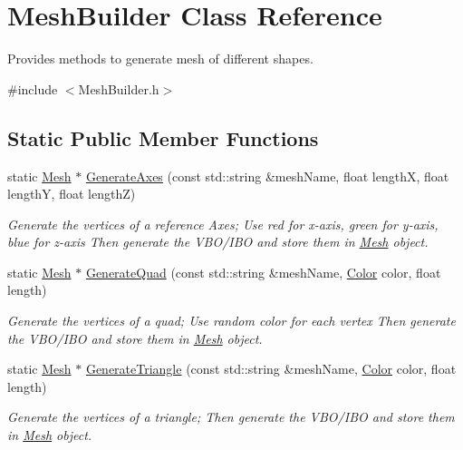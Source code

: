 \hypertarget{class_mesh_builder}{\section{Mesh\+Builder Class Reference}
\label{class_mesh_builder}
}


Provides methods to generate mesh of different shapes.  




{\ttfamily \#include $<$Mesh\+Builder.\+h$>$}

\subsection*{Static Public Member Functions}
\begin{DoxyCompactItemize}
\item 
static \hyperlink{class_mesh}{Mesh} $\ast$ \hyperlink{class_mesh_builder_a78d37e2b0cc068eec801f17c367100e7}{Generate\+Axes} (const std\+::string \&mesh\+Name, float length\+X, float length\+Y, float length\+Z)
\begin{DoxyCompactList}\small\item\em Generate the vertices of a reference Axes; Use red for x-\/axis, green for y-\/axis, blue for z-\/axis Then generate the V\+B\+O/\+I\+B\+O and store them in \hyperlink{class_mesh}{Mesh} object. \end{DoxyCompactList}\item 
static \hyperlink{class_mesh}{Mesh} $\ast$ \hyperlink{class_mesh_builder_aec661388bddf32e7bf834b38fb5ed34d}{Generate\+Quad} (const std\+::string \&mesh\+Name, \hyperlink{struct_color}{Color} color, float length)
\begin{DoxyCompactList}\small\item\em Generate the vertices of a quad; Use random color for each vertex Then generate the V\+B\+O/\+I\+B\+O and store them in \hyperlink{class_mesh}{Mesh} object. \end{DoxyCompactList}\item 
static \hyperlink{class_mesh}{Mesh} $\ast$ \hyperlink{class_mesh_builder_abe59149c68717536e3d638eb634b12e4}{Generate\+Triangle} (const std\+::string \&mesh\+Name, \hyperlink{struct_color}{Color} color, float length)
\begin{DoxyCompactList}\small\item\em Generate the vertices of a triangle; Then generate the V\+B\+O/\+I\+B\+O and store them in \hyperlink{class_mesh}{Mesh} object. \end{DoxyCompactList}\item 

\end{DoxyCompactItemize}
